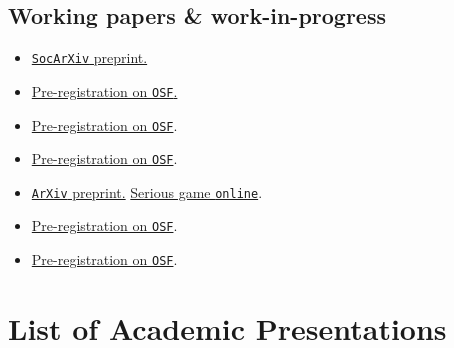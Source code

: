 \documentclass[12pt,a4paper]{moderncv}
\begin{document}
\subsection{Working papers \& work-in-progress}
\begin{itemize}[leftmargin=2.75cm,itemsep=2pt]
\item { \href{https://www.doi.org/10.31235/osf.io/kr64j_v1}{\texttt{SocArXiv} preprint.}}
\item { \href{https://www.doi.org/10.17605/OSF.IO/JNS4H}{Pre-registration on \texttt{OSF}.}} 
\item { \href{https://osf.io/h2stv/?view_only=db9bcdb538bb4a028d96aec6c6821ab6}{Pre-registration on \texttt{OSF}}.}
\item { \href{https://osf.io/atcyr/?view_only=0b7495d1f3ca480fbc1a8dfef4a64911}{Pre-registration on \texttt{OSF}}.}
\item {
\href{https://doi.org/10.48550/arXiv.2508.12799}{\texttt{ArXiv} preprint.} \href{https://sweet-sure.ch/game/}{Serious game \texttt{online}}.}
\item { \href{https://osf.io/5atwq/?view_only=d5afa28f9a214b48af3ec1d514dbc7d4}{Pre-registration on \texttt{OSF}}.}
\item { \href{https://osf.io/5atwq/?view_only=d5afa28f9a214b48af3ec1d514dbc7d4}{Pre-registration on \texttt{OSF}}.}
\end{itemize}


\section{List of Academic Presentations}
\end{document}
